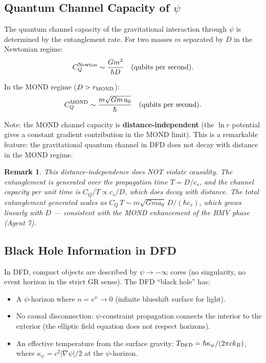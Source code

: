 \documentclass[11pt,a4paper]{article}
\newtheorem{remark}{Remark}
\begin{document}
\subsection{Quantum Channel Capacity of $\psi$}
\label{sec:channel-capacity}

The quantum channel capacity of the gravitational interaction through $\psi$ is determined by the entanglement rate. For two masses $m$ separated by $D$ in the Newtonian regime:
\begin{equation}
C_Q^{\rm Newton} \sim \frac{Gm^2}{\hbar D}\quad\text{(qubits per second)}.
\end{equation}

In the MOND regime ($D > r_{\rm MOND}$):
\begin{equation}
C_Q^{\rm MOND} \sim \frac{m\sqrt{Gm\,a_0}}{\hbar}\quad\text{(qubits per second)}.
\end{equation}

Note: the MOND channel capacity is \textbf{distance-independent} (the $\ln r$ potential gives a constant gradient contribution in the MOND limit). This is a remarkable feature: the gravitational quantum channel in DFD does not decay with distance in the MOND regime.

\begin{remark}
This distance-independence does NOT violate causality. The entanglement is generated over the propagation time $T = D/c_s$, and the channel capacity per unit time is $C_Q/T \propto c_s/D$, which does decay with distance. The total entanglement generated scales as $C_Q\,T \sim m\sqrt{Gma_0}\,D/(\hbar c_s)$, which grows linearly with $D$ --- consistent with the MOND enhancement of the BMV phase (Agent 7).
\end{remark}

\subsection{Black Hole Information in DFD}
\label{sec:BH-information}

In DFD, compact objects are described by $\psi \to -\infty$ cores (no singularity, no event horizon in the strict GR sense). The DFD ``black hole'' has:

\begin{itemize}
\item A $\psi$-horizon where $n = e^\psi \to 0$ (infinite blueshift surface for light).
\item No causal disconnection: $\psi$-constraint propagation connects the interior to the exterior (the elliptic field equation does not respect horizons).
\item An effective temperature from the surface gravity: $T_{\rm DFD} = \hbar\kappa_\psi/(2\pi c k_B)$, where $\kappa_\psi = c^2|\nabla\psi|/2$ at the $\psi$-horizon.
\end{itemize}
\end{document}
